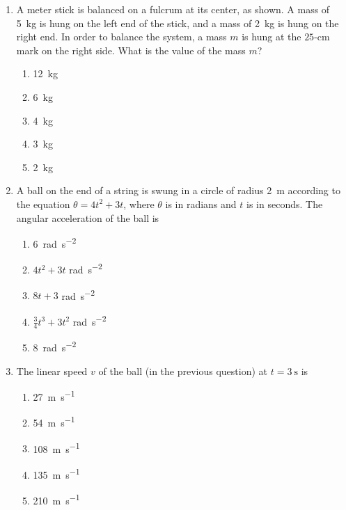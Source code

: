\documentclass{../../oss-apphys}
\begin{document}
\begin{multicols}{2}
\begin{enumerate}[leftmargin=18pt]
  \item A meter stick is balanced on a fulcrum at its center, as shown. A mass
    of \SI{5}{\kilo\gram} is hung on the left end of the stick, and a mass of
    \SI{2}{\kilo\gram} is hung on the right end. In order to balance the
    system, a mass $m$ is hung at the $25$-\si{\centi\metre} mark on the right
    side. What is the value of the mass $m$?
    \begin{center}
    \end{center}
    \begin{enumerate}[noitemsep,topsep=0pt,leftmargin=18pt,label=(\Alph*)]
    \item\SI{12}{\kilo\gram}
    \item\SI{6 }{\kilo\gram}
    \item\SI{4 }{\kilo\gram}
    \item\SI{3 }{\kilo\gram}
    \item\SI{2 }{\kilo\gram}
    \end{enumerate}
    
  \item A ball on the end of a string is swung in a circle of radius
    \SI{2}{\metre} according to the equation $\theta = 4t^2+3t$, where $\theta$
    is in radians and $t$ is in seconds. The angular acceleration of the ball
    is
    \begin{enumerate}[noitemsep,topsep=0pt,leftmargin=18pt,label=(\Alph*)]
    \item\SI{6}{rad\per\second^2}
    \item $4t^2 + 3t$ \si{rad\per\second^2}
    \item $8t +3$ \si{rad\per\second^2}
    \item $\displaystyle\frac{3}{4} t^3 + 3t^2$ \si{rad\per\second^2}
    \item \SI{8}{rad\per\second^2}
    \end{enumerate}
  
  \item The linear speed $v$ of the ball (in the previous question) at
    $t=\SI{3}{\second}$ is
    \begin{enumerate}[noitemsep,topsep=0pt,leftmargin=18pt,label=(\Alph*)]
    \item\SI{27 }{\metre\per\second}
    \item\SI{54 }{\metre\per\second}
    \item\SI{108}{\metre\per\second}
    \item\SI{135}{\metre\per\second}
    \item\SI{210}{\metre\per\second}
    \end{enumerate}
    \columnbreak
    

\end{enumerate}
\end{multicols}
\end{document}
